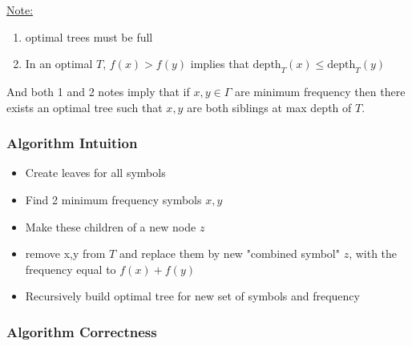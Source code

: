 \documentclass[12pt]{article}
\begin{document}
\begin{tcolorbox}
	\underline{Note:}
	\begin{enumerate}
		\item{optimal trees must be full}
		\item{In an optimal $T$, $f(x) > f(y)$ implies that $\text{depth}_T (x) \leq \text{depth}_T (y)$}
	\end{enumerate}
\end{tcolorbox}

And both 1 and 2 notes imply that if $x,y\in\Gamma$ are minimum frequency then there exists an optimal tree such that $x,y$ are both siblings at max depth of $T$.

\subsubsection{Algorithm Intuition}

\begin{itemize}
	\item{Create leaves for all symbols}
	\item{Find 2 minimum frequency symbols $x,y$}
	\item{Make these children of a new node $z$}
	\item{remove x,y from $T$ and replace them by new "combined symbol" $z$, with the frequency equal to $f(x) + f(y)$}
	\item{Recursively build optimal tree for new set of symbols and frequency}
\end{itemize}

\subsubsection{Algorithm Correctness}
\end{document}
